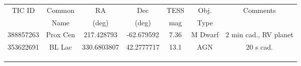 \documentclass[letterpaper,11pt]{article}
\begin{document}
\begin{center}
\begin{tabular}{ | c | c | c | c | c | c | c | }
\hline
TIC ID          &      Common      &     RA             &      Dec          &      TESS       &       Obj.        &      Comments \\       
                    &      Name           &     (deg)          &      (deg)        &      mag         &       Type       &                         \\     
\hline
\hline
388857263  &  Prox Cen           &  217.428793  &  -62.679592  &  7.36             &    M Dwarf    & 2 min cad., RV planet \\ \hline
353622691  &  BL Lac               &   330.6803807    &   42.2777717    &   13.1  &   AGN            &    20 s cad.                                 \\ \hline
                    &                           &                       &                      &                      &                     &                                     \\ \hline
                    &                           &                       &                      &                      &                     &                                     \\ \hline
                    &                           &                       &                      &                      &                     &                                     \\ \hline
\end{tabular}
\end{center}   

\end{document}
